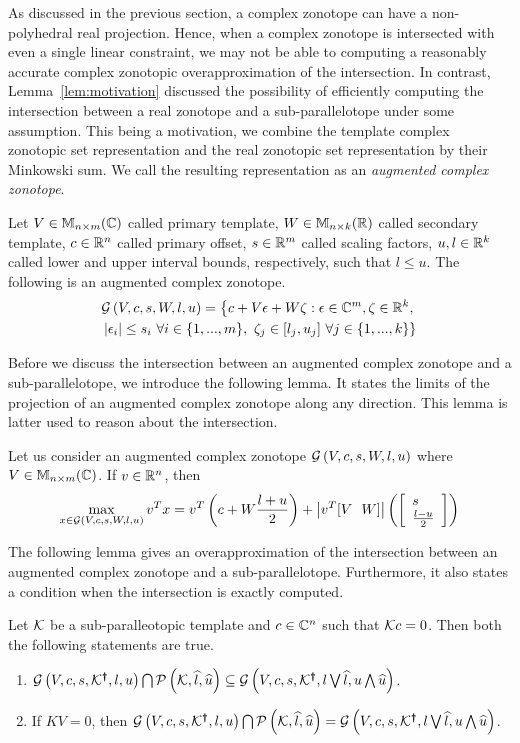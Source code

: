 As discussed in the previous section, a complex zonotope can have a
non-polyhedral real projection.  Hence, when a complex zonotope is
intersected with even a single linear constraint, we may not be able
to computing a reasonably accurate complex zonotopic overapproximation
of the intersection.  In contrast, Lemma~\ref{lem:motivation}
discussed the possibility of efficiently computing the intersection
between a real zonotope and a sub-parallelotope under some assumption.
This being a motivation, we combine the template complex zonotopic set
representation and the real zonotopic set representation by their
Minkowski sum.  We call the resulting representation as an
\emph{augmented complex zonotope}.
%
\begin{definition}
Let $V\in\mathbb{M}_{n\times m}(\mathbb{C})$ called primary template, $W\in\mathbb{M}_{n\times k}(\mathbb{R})$
called secondary template, $c\in\mathbb{R}^n$ called primary offset,
$s\in\mathbb{R}^m$ called scaling factors, $u,l\in\mathbb{R}^k$ called lower
and upper interval bounds, respectively, such that $l\leq u$.  The
following is an augmented complex
zonotope.
\begin{multline}
\mathcal{G}\left(V,c,s,W,l,u\right) =
\left\{
  c+V\epsilon+W\zeta:\epsilon\in\mathbb{C}^m,\zeta\in\mathbb{R}^k,\right.\\ \left.  \left|\epsilon_i\right|\leq
 s_i~\forall i\in\{1,...,m\},~\zeta_j\in[l_j,u_j]~\forall j\in \{1,...,k\}
\right\}
\end{multline}
\end{definition}
%
Before we discuss the intersection between an augmented complex
zonotope and a sub-parallelotope, we introduce the following lemma.
It states the limits of the projection of an augmented complex
zonotope along any direction.  This lemma is latter used to reason
about the intersection.
%
\begin{lemma}
Let us consider an augmented complex zonotope $\mathcal{G}\left(V,c,s,W,l,u\right)$
where $V\in\mathbb{M}_{n\times m}(\mathbb{\mathbb{C}})$.  If $v\in\mathbb{R}^n$, then
\[
\max_{x\in\mathcal{G}\left(V,c,s,W,l,u\right)}v^Tx = v^T\left(c+W\frac{l+u}{2}\right)+\left|v^T[V~~W]\right|\left(\left[\begin{array}{l}{s}\\{\frac{l-u}{2}} \end{array}\right]\right)
\]
\end{lemma}
%
The following lemma gives an overapproximation of the intersection
between an augmented complex zonotope and a sub-parallelotope.
Furthermore, it also states a condition when the intersection is
exactly computed.
%
\begin{lemma}
Let $\mathcal{K}$ be a sub-paralleotopic template and $c\in\mathbb{C}^n$
such that $\mathcal{K} c=0$.  Then both the following statements are
true.
\begin{enumerate}
\item
  $\mathcal{G}\left(V,c,s,\mathcal{K}^{\bm{\dagger}},l,u\right)\bigcap\mathcal{P}\left(\mathcal{K},\widehat{l},\widehat{u}\right)\subseteq
  \mathcal{G}\left(V,c,s,\mathcal{K}^{\bm{\dagger}},l\bigvee\widehat{l},u\bigwedge\widehat{u}\right)$.
\item If $KV=0$, then $\mathcal{G}\left(V,c,s,\mathcal{K}^{\bm{\dagger}},l,u\right)\bigcap\mathcal{P}\left(\mathcal{K},\widehat{l},\widehat{u}\right)=
  \mathcal{G}\left(V,c,s,\mathcal{K}^{\bm{\dagger}},l\bigvee\widehat{l},u\bigwedge\widehat{u}\right)$.
\end{enumerate}
\end{lemma}

